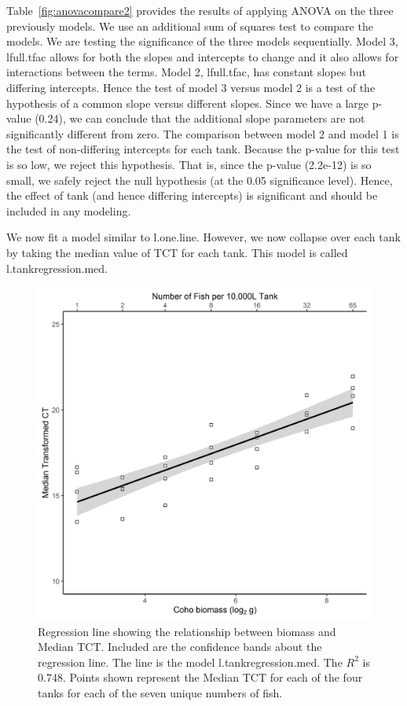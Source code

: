 Table~\ref{fig:anovacompare2} provides the results of applying ANOVA on the three previously models. We use an additional sum of squares test to compare the models. We are testing the significance of the three models sequentially. Model 3, lfull.tfac allows for both the slopes and intercepts to change and it also allows for interactions between the terms. Model 2, lfull.tfac, has constant slopes but differing intercepts. Hence the test of model 3 versus model 2 is a test of the hypothesis of a common slope versus different slopes. Since we have a large p-value (0.24), we can conclude that the additional slope parameters are not significantly different from zero. The comparison between model 2 and model 1 is the test of non-differing intercepts for each tank. Because the p-value for this test is so low, we reject this hypothesis. That is, since the p-value (2.2e-12) is so small, we safely reject the null hypothesis (at the 0.05 significance level). Hence, the effect of tank (and hence differing intercepts) is significant and should be included in any modeling. 

\newpage

We now fit a model similar to l.one.line. However, we now collapse over each tank by taking the median value of TCT for each tank. This model is called l.tankregression.med.

   \vspace{12pt}

\begin{figure}[H]
\includegraphics{Chapter3Images/ggplotnew5.png}
\caption{ \hspace{1mm}   Regression line showing the relationship between biomass and Median TCT. Included are the confidence bands about the regression line.  The line is the model l.tankregression.med. The $R^{2}$ is 0.748. Points shown represent the Median TCT for each of the four tanks for each of the seven unique numbers of fish.
}
\label{fig:medct44}
\end{figure}




